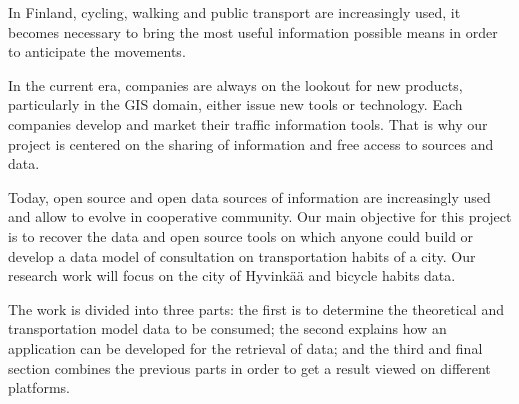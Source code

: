 






In Finland, cycling, walking and public transport are increasingly used, it becomes necessary to bring the most useful information possible means in order to anticipate the movements.

In the current era, companies are always on the lookout for new products, particularly in the GIS domain, either issue new tools or technology. Each companies develop and market their traffic information tools. That is why our project is centered on the sharing of information and free access to sources and data.

Today, open source and open data sources of information are increasingly used and allow to evolve in cooperative community. Our main objective for this project is to recover the data and open source tools on which anyone could build or develop a data model of consultation on transportation habits of a city. Our research work will focus on the city of Hyvinkää and bicycle habits data.

The work is divided into three parts: the first is to determine the theoretical and transportation model data to be consumed; the second explains how an application can be developed for the retrieval of data; and the third and final section combines the previous parts in order to get a result viewed on different platforms.


